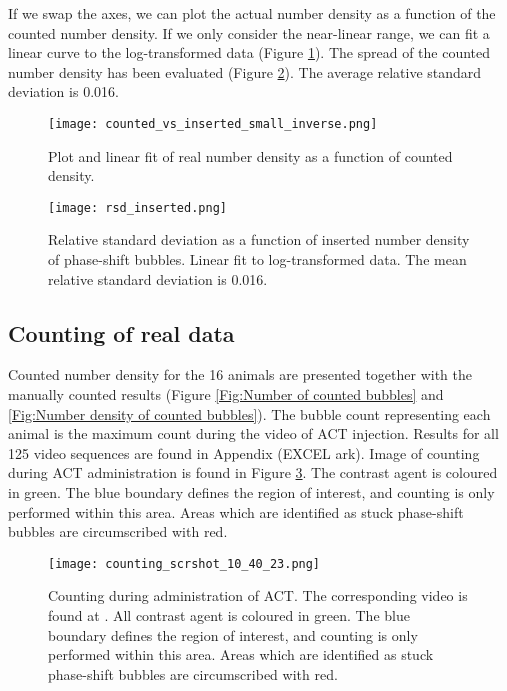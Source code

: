 If we swap the axes, we can plot the actual number density as a function of the counted number density. If we only consider the near-linear range, we can fit a linear curve to the log-transformed data (Figure \ref{Fig:counted_vs_inserted_inverse}). The spread of the counted number density has been evaluated (Figure \ref{Fig:rsd}). The average relative standard deviation is 0.016.

\begin{figure}[h]
  \centering
  \texttt{[image: counted\_vs\_inserted\_small\_inverse.png]}
  \caption{Plot and linear fit of real number density as a function of counted density.}
  \label{Fig:counted_vs_inserted_inverse}
\end{figure}

\begin{figure}[h]
	\centering
	\texttt{[image: rsd\_inserted.png]}
	\caption{Relative standard deviation as a function of inserted number density of phase-shift bubbles. Linear fit to log-transformed data. The mean relative standard deviation is 0.016.}
	\label{Fig:rsd}
\end{figure}


\subsection{Counting of real data}
Counted number density for the 16 animals are presented together with the manually counted results (Figure \ref{Fig:Number of counted bubbles} and \ref{Fig:Number density of counted bubbles}). The bubble count representing each animal is the maximum count during the video of ACT\texttrademark{} injection. Results for all 125 video sequences are found in Appendix (EXCEL ark). Image of counting during ACT\texttrademark{} administration is found in Figure \ref{Fig:counting_administration}. The contrast agent is coloured in green. The blue boundary defines the region of interest, and counting is only performed within this area. Areas which are identified as stuck phase-shift bubbles are circumscribed with red.

\begin{figure}[h]
  \centering
  \texttt{[image: counting\_scrshot\_10\_40\_23.png]}
  \cprotect\caption{Counting during administration of ACT\texttrademark{}. The corresponding video is found at . All contrast agent is coloured in green. The blue boundary defines the region of interest, and counting is only performed within this area. Areas which are identified as stuck phase-shift bubbles are circumscribed with red.}
  \label{Fig:counting_administration}
\end{figure}

